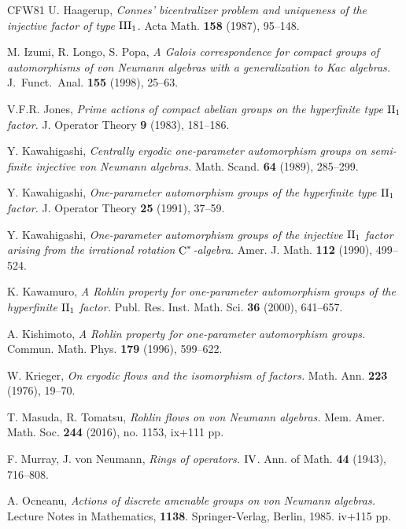 \documentclass[a4paper,11pt]{amsart}
\numberwithin{equation}{section}
\theoremstyle{definition}
\newcommand{\rC}{\mathord{\text{\rm C}}}
\newcommand{\II}{{\rm II}}
\begin{document}
\begin{thebibliography}{CFW81}
 {\sc U. Haagerup}, {\it Connes' bicentralizer problem and uniqueness of the injective factor of type ${\rm III_1}$.} Acta Math. {\bf 158} (1987), 95--148.

 {\sc M. Izumi, R. Longo, S. Popa}, {\it A Galois correspondence for compact groups of automorphisms of von Neumann algebras with a generalization to Kac algebras.} J.\ Funct.\ Anal. {\bf 155} (1998), 25--63.

 {\sc V.F.R. Jones}, {\it Prime actions of compact abelian groups on the hyperfinite type $\II_1$ factor.} J. Operator Theory {\bf 9}  (1983), 181--186.

 {\sc Y. Kawahigashi}, {\it Centrally ergodic one-parameter automorphism groups on semi- finite injective von Neumann algebras.} Math. Scand. {\bf 64} (1989), 285--299.

 {\sc Y. Kawahigashi}, {\it One-parameter automorphism groups of the hyperfinite type $\II_1$ factor.} J. Operator Theory {\bf 25} (1991), 37--59.

 {\sc Y. Kawahigashi}, {\it One-parameter automorphism groups of the injective $\II_1$ factor arising from the irrational rotation $\rC^*$-algebra.} Amer. J. Math. {\bf 112} (1990), 499--524.

 {\sc K. Kawamuro}, {\it A Rohlin property for one-parameter automorphism groups of the hyperfinite $\II_1$ factor.} Publ. Res. Inst. Math. Sci. {\bf 36} (2000), 641--657.

 {\sc A. Kishimoto}, {\it A Rohlin property for one-parameter automorphism groups.} Commun. Math. Phys. {\bf 179} (1996), 599--622.

 {\sc W. Krieger}, {\it On ergodic flows and the isomorphism of factors.} Math. Ann. {\bf 223} (1976), 19--70.

 {\sc T. Masuda, R. Tomatsu}, {\it Rohlin flows on von Neumann algebras.} Mem. Amer. Math. Soc. {\bf 244} (2016), no. 1153, ix+111 pp.

 {\sc F. Murray, J. von Neumann}, {\it Rings of operators.} ${\rm IV}$.  Ann. of Math. {\bf 44} (1943), 716--808.

 {\sc A. Ocneanu}, {\it Actions of discrete amenable groups on von Neumann algebras.} Lecture Notes in Mathematics, {\bf 1138}. Springer-Verlag, Berlin, 1985. iv+115 pp.


\end{thebibliography}
\end{document}
